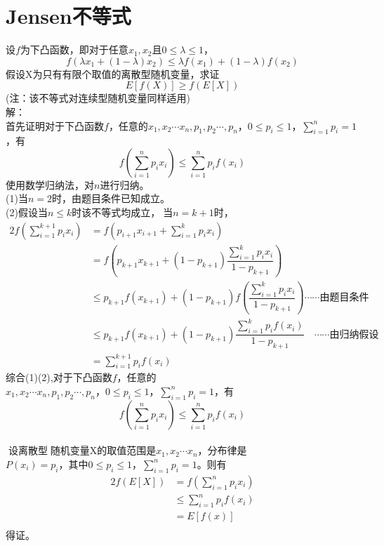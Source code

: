 \documentclass[a4papers]{ctexart}
\begin{document}
\section{Jensen不等式}
设$f$为下凸函数，即对于任意$x_1,x_2$且$0\le\lambda\le 1$，
\[f(\lambda x_1 + (1-\lambda)x_2)\le\lambda f(x_1)+(1-\lambda)f(x_2)\]
\indent 假设X为只有有限个取值的离散型随机变量，求证
\[E[f(X)]\ge f(E[X])\]
\indent (注：该不等式对连续型随机变量同样适用)\\
\noindent 解：\\
首先证明对于下凸函数$f$，任意的$x_1,x_2\cdots x_n,p_1,p_2\cdots,p_n，0\le p_i \le 1，\sum_{i=1}^n p_i=1$，有\\
\[ f(\sum_{i=1}^n p_i x_i)\le \sum_{i=1}^n p_i f(x_i)  \]
使用数学归纳法，对$n$进行归纳。\\
(1)当$n=2$时，由题目条件已知成立。\\
(2)假设当$n \le k$时该不等式均成立，当$n=k+1$时，\\
\begin{alignat*}{2}
f(\sum_{i=1}^{k+1} p_i x_i) 
&= f(p_{i+1} x_{i+1} + \sum_{i=1}^k p_i x_i)\\
&= f\left( p_{k+1} x_{k+1} + (1-p_{k+1})\dfrac{\sum_{i=1}^k p_i x_i}{1-p_{k+1}} \right)\\
&\le p_{k+1} f(x_{k+1}) + (1-p_{k+1}) f\left(\dfrac{\sum_{i=1}^k p_i x_i}{1-p_{k+1}}\right) \cdots \cdots 由题目条件\\
&\le p_{k+1} f(x_{k+1}) + (1-p_{k+1}) \dfrac{\sum_{i=1}^k p_i f(x_i)}{1-p_{k+1}}\quad\cdots \cdots 由归纳假设\\
&= \sum_{i=1}^{k+1} p_i f(x_i) 
\end{alignat*}
综合(1)(2),对于下凸函数$f$，任意的$x_1,x_2\cdots x_n,p_1,p_2\cdots,p_n，0\le p_i \le 1，\sum_{i=1}^n p_i=1$，有\\
\[ f(\sum_{i=1}^n p_i x_i)\le \sum_{i=1}^n p_i f(x_i)  \]\\
设离散型随机变量X的取值范围是$x_1,x_2\cdots x_n$，分布律是$P(x_i)=p_i，其中0\le p_i \le 1，\sum_{i=1}^n p_i=1$。则有\\
\begin{alignat*}{2}
    f(E[X])&= f(\sum_{i=1}^n p_i x_i)\\
           &\le \sum_{i=1}^n p_i f(x_i) \\
           &= E[f(x)]\\
\end{alignat*}
得证。
\end{document}
